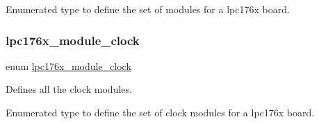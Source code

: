 Enumerated type to define the set of modules for a lpc176x board. \mbox{\label{common-types_8h_a85061df77e71b5b46c44251eebe4c5cf}} 
\subsubsection{\texorpdfstring{lpc176x\_module\_clock}{lpc176x\_module\_clock}}
{\footnotesize\ttfamily enum \mbox{\hyperlink{common-types_8h_a85061df77e71b5b46c44251eebe4c5cf}{lpc176x\+\_\+module\+\_\+clock}}}



Defines all the clock modules. 

Enumerated type to define the set of clock modules for a lpc176x board. 
